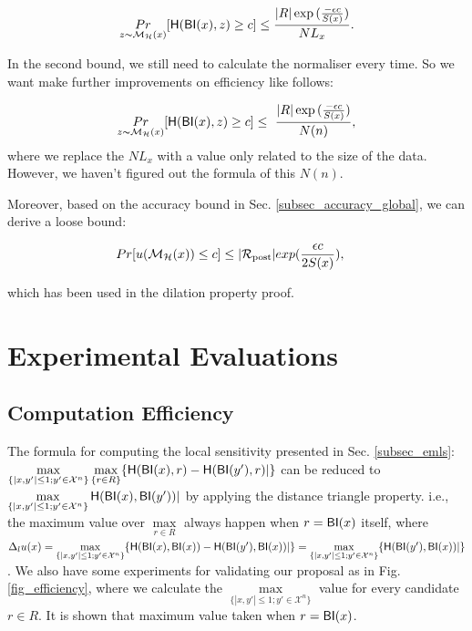 \documentclass[sigconf]{acmart}
\begin{document}
\begin{equation*}
\underset{z \thicksim \mathcal{M}_{\mathcal{H}}(x)}{Pr}[ \mathsf{H}(\mathsf{BI}(x), z) \geq c] \leq \frac{|R| \exp{(\frac{- \epsilon c}{S(x)}})}{NL_x}.
\end{equation*}

In the second bound, we still need to calculate the normaliser every time. So we want make further improvements on efficiency like follows:

\begin{equation*}
\underset{z \thicksim \mathcal{M}_{\mathcal{H}}(x)}{Pr}[ \mathsf{H}(\mathsf{BI}(x), z) \geq c] \leq \ \frac{|R| \exp{(\frac{- \epsilon c}{S(x)}})}{N(n)},
\end{equation*}
where we replace the $NL_x$ with a value only related to the size of the data. However, we haven't figured out the formula of this $N(n)$.

Moreover, based on the accuracy bound in Sec. \ref{subsec_accuracy_global}, we can derive a loose bound:

\begin{equation*}
\begin{split}
Pr[u(\mathcal{M}_{\mathcal{H}}(x)) \leq c] 
& \leq |\mathcal{R}_{\textup{post}}|exp(\frac{\epsilon c}{2 S(x)}),
\end{split}
\end{equation*}

which has been used in the dilation property proof.


\section{Experimental Evaluations}
\label{sec_experiment}

\subsection{Computation Efficiency}
\label{subsec_effi}
The formula for computing the local sensitivity presented in Sec. \ref{subsec_emls}:$\max\limits_{\{|x,y'| \leq 1; y'\in \mathcal{X}^n\}}\max\limits_{\{r\in R\}} \{\mathsf{H}(\mathsf{BI}(x), r) - \mathsf{H}(\mathsf{BI}(y'), r)|\}$ can be reduced to $\max\limits_{\{|x,y'| \leq 1;y'\in \mathcal{X}^n\}}\mathsf{H}(\mathsf{BI}(x), \mathsf{BI}(y'))|$ by applying the distance triangle property. i.e., the maximum value over $\max\limits_{r \in R}$ always happen when $r = \mathsf{BI}(x)$ itself, where $\Delta_{l}u(x) = \max\limits_{\{|x,y'| \leq 1;y'\in \mathcal{X}^n\}} \{\mathsf{H}(\mathsf{BI}(x), \mathsf{BI}(x)) - \mathsf{H}(\mathsf{BI}(y'), \mathsf{BI}(x))|\} = \max\limits_{\{|x,y'| \leq 1;y'\in \mathcal{X}^n\}} \{\mathsf{H}(\mathsf{BI}(y'), \mathsf{BI}(x))|\}$. We also have some experiments for validating our proposal as in Fig. \ref{fig_efficiency}, where we calculate the $\max\limits_{\{|x,y'| \leq 1;y'\in \mathcal{X}^n\}}$ value for every candidate $r \in R$. It is shown that maximum value taken when  $r = \mathsf{BI}(x)$.
\end{document}
